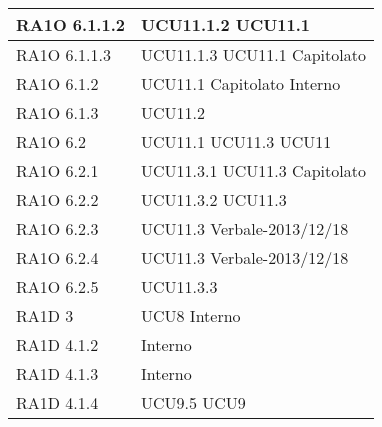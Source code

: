 \begin{center}
\begin{longtable}{ | p{5cm} | p{5cm} |}
        RA1O 6.1.1.2 &  UCU11.1.2 \newline  UCU11.1 \newline  \\ \hline      
        RA1O 6.1.1.3  &  UCU11.1.3 \newline  UCU11.1 \newline  Capitolato \newline  \\ \hline      
        RA1O 6.1.2  &  UCU11.1 \newline  Capitolato \newline  Interno \newline  \\ \hline      
        RA1O 6.1.3  &  UCU11.2 \newline  \\ \hline      
        RA1O 6.2  &  UCU11.1 \newline  UCU11.3 \newline  UCU11 \newline  \\ \hline      
        RA1O 6.2.1 &  UCU11.3.1 \newline  UCU11.3 \newline  Capitolato \newline  \\ \hline      
        RA1O 6.2.2 &  UCU11.3.2 \newline  UCU11.3 \newline  \\ \hline      
        RA1O 6.2.3 &  UCU11.3 \newline  Verbale-2013/12/18 \newline  \\ \hline      
        RA1O 6.2.4 &  UCU11.3 \newline  Verbale-2013/12/18 \newline  \\ \hline      
        RA1O 6.2.5 &  UCU11.3.3 \newline  \\ \hline      
        RA1D 3  &  UCU8 \newline  Interno \newline  \\ \hline      
        RA1D 4.1.2  &  Interno \newline  \\ \hline      
        RA1D 4.1.3  &  Interno \newline  \\ \hline      
        RA1D 4.1.4  &  UCU9.5 \newline  UCU9 \newline  \\ \hline      

\end{longtable}
\end{center}
